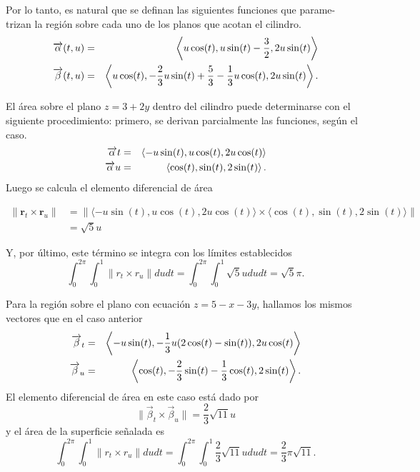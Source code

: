 Por lo tanto, es natural que se definan las siguientes funciones que parame- \\ trizan la región sobre cada uno de los planos que acotan el cilindro.
\begin{eqnarray*}
\overrightarrow{\alpha }(t,u)&=&\left \langle u\cos (t),u\sin (t)-\frac{3}{2},2u\sin (t)\right \rangle \\
\overrightarrow{\beta }(t,u)&=&\left \langle u\cos (t),-\frac{2}{3}u\sin (t)+\frac{5}{3}-\frac{1}{3}u\cos (t),2u\sin (t)\right \rangle.
\end{eqnarray*}

El área sobre el plano $z=3+2y$ dentro del cilindro puede determinarse con el siguiente procedimiento: primero, se derivan parcialmente las funciones, según el caso.
\begin{eqnarray*}
\overrightarrow{\alpha }{t}&=& \left \langle -u\sin (t),u\cos (t),2u\cos (t)\right \rangle  \\
\overrightarrow{\alpha }{u}&=& \left \langle \cos (t),\sin (t),2\sin (t)\right \rangle.
\end{eqnarray*}
Luego se calcula el elemento diferencial de área

\begin{align*}
\|\mathbf{r}_t \times \mathbf{r}_u\| &= \| \langle -u\sin(t), u\cos(t), 2u\cos(t) \rangle \times \langle \cos(t), \sin(t), 2\sin(t) \rangle \| \\
&= \sqrt{5}u
\end{align*}

Y, por último, este término se integra con los límites establecidos
\[\int_{0}^{2\pi }\int_{0}^{1}\| r_{t}\times r_{u}\|
dudt=\int_{0}^{2\pi }\int_{0}^{1}\sqrt{5}ududt= \sqrt{5}\pi.\]

Para la región sobre el plano con ecuación $z=5-x-3y$,
hallamos los mismos vectores que en el caso anterior
\begin{eqnarray*}
\overrightarrow{\beta}_{t}&=&  \left \langle -u\sin (t),-\frac{1}{3}u( 2\cos (t)-\sin (t))  ,2u\cos (t) \right \rangle  \\
\overrightarrow{\beta}_{u}&=& \left \langle \cos (t),-\frac{2}{3}\sin (t)-\frac{1}{3}\cos (t),2\sin (t)\right \rangle.
\end{eqnarray*}
El elemento diferencial de área en este caso está dado por
\[\| \overrightarrow{\beta}_{t} \times \overrightarrow{\beta}_{u} \|= \frac{2}{3}\sqrt{11}u\]
y el área de la superficie señalada es
\[\int_{0}^{2\pi }\int_{0}^{1}\| r_{t}\times r_{u}\|
dudt=\int_{0}^{2\pi }\int_{0}^{1}\frac{2}{3}\sqrt{11}ududt= \frac{2}{3}\pi \sqrt{11}.\]

